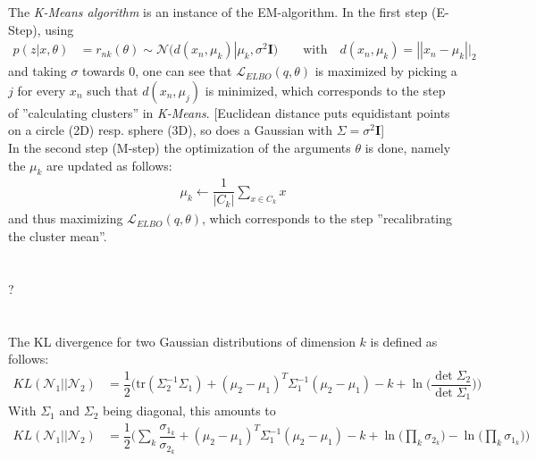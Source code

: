 \documentclass[11pt]{article}
\newcommand{\exercise}{\section{}}
\begin{document}
\noindent The \textit{K-Means algorithm} is an instance of the EM-algorithm. In the first step (E-Step), using
\begin{align*}
	p(z|x,\theta) &= r_{nk}(\theta) \sim \mathcal{N}(d(x_n, \mu_k) | \mu_k, \sigma^2 \boldsymbol{I})
	\quad\quad \text{with}\quad d(x_n, \mu_k) = ||x_n - \mu_k||_2
\end{align*}
and taking $\sigma$ towards $0$, one can see that $\mathcal{L}_{ELBO}(q, \theta)$ is maximized by picking a $j$ for every $x_n$ such that $d(x_n, \mu_j)$ is minimized, which corresponds to the step of ''calculating clusters'' in \textit{K-Means}. [Euclidean distance puts equidistant points on a circle (2D) resp. sphere (3D), so does a Gaussian with $\Sigma = \sigma^2 \boldsymbol{I}$]\\

\noindent In the second step (M-step) the optimization of the arguments $\theta$ is done, namely the $\mu_k$ are updated as follows:
\begin{align*}
	\mu_k \leftarrow \dfrac{1}{|C_k|} \sum_{x \in C_k} x
\end{align*}
and thus maximizing $\mathcal{L}_{ELBO}(q, \theta)$, which corresponds to the step ''recalibrating the cluster mean''.

\exercise
?

\exercise
The KL divergence for two Gaussian distributions of dimension $k$ is defined as follows:
\begin{align*}
	KL(\mathcal{N}_1 || \mathcal{N}_2) &= \dfrac{1}{2} \Big(\text{tr}(\Sigma_2^{-1}\Sigma_1) + (\mu_2 - \mu_1)^T \Sigma_1^{-1}(\mu_2 - \mu_1) - k + \ln\big(\dfrac{\det \Sigma_2}{\det \Sigma_1}\big)\Big)
\end{align*}
With $\Sigma_1$ and $\Sigma_2$ being diagonal, this amounts to
\begin{align*}
	KL(\mathcal{N}_1 || \mathcal{N}_2) &= \dfrac{1}{2} \Big(\sum_k \dfrac{\sigma_{1_k}}{\sigma_{2_k}} + (\mu_2 - \mu_1)^T \Sigma_1^{-1}(\mu_2 - \mu_1) - k + \ln\big(\prod_k \sigma_{2_k}{}\big) - \ln\big(\prod_k \sigma_{1_k}\big)\Big)
\end{align*}
\end{document}
